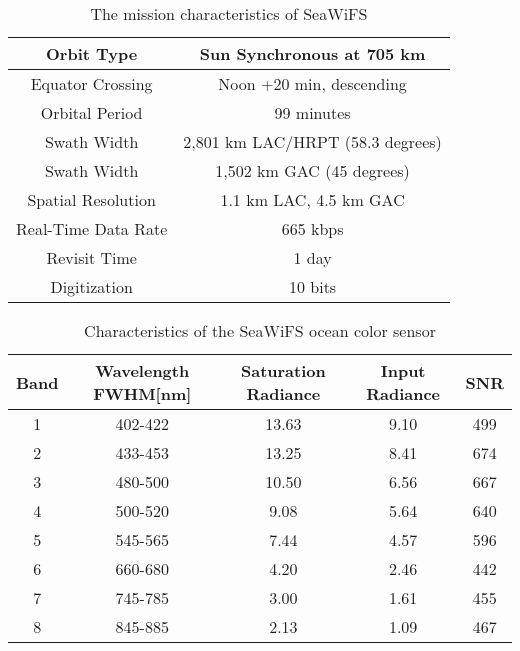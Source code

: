  \begin{table}[h!]
 	\caption{The mission characteristics of SeaWiFS}
 	\label{table01}
 	\centering
 	\begin{tabular}{c  c}
  	\toprule%
  	 	Orbit Type	& Sun Synchronous at 705 km \\ \hline
 	Equator Crossing &	Noon +20 min, descending \\ \hline
 	Orbital Period &	99 minutes  \\ \hline
 	Swath Width &	2,801 km LAC/HRPT (58.3 degrees)  \\ \hline
 	Swath Width &	1,502 km GAC (45 degrees)  \\ \hline
 	Spatial Resolution &	1.1 km LAC, 4.5 km GAC  \\ \hline
 	Real-Time Data Rate &	665 kbps  \\ \hline
 	Revisit Time &	1 day  \\ \hline
 	Digitization &	10 bits  \\ 
 	\bottomrule
 	\end{tabular}
 \end{table}

 \begin{table}[h!]%
	\caption{Characteristics of the SeaWiFS ocean color sensor}
	\label{table02}
	\centering
	\begin{tabular}{c  c  c  c  c}
		\toprule
		Band	& Wavelength FWHM[nm] & Saturation Radiance & Input Radiance & SNR\\ %
		\midrule
		1 & 402-422 & 13.63 & 9.10 & 499 \\ %
		2 & 433-453 & 13.25 & 8.41 & 674  \\ %
		3 & 480-500 & 10.50 & 6.56 & 667 \\ %
		4 & 500-520 & 9.08 & 5.64 & 640  \\ %
		5 & 545-565 & 7.44 & 4.57 & 596 \\ %
		6 & 660-680 & 4.20 & 2.46 & 442  \\ %
		7 & 745-785 & 3.00 & 1.61 & 455 \\ %
		8 & 845-885 & 2.13 & 1.09 & 467  \\ %
		 	\bottomrule
	\end{tabular}
\end{table}
 
 

